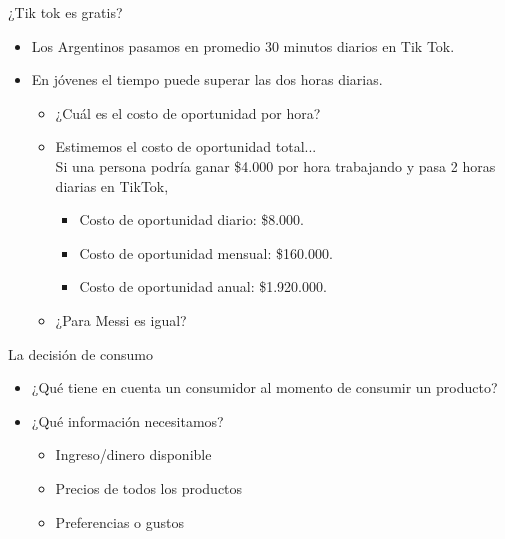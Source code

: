 \documentclass{beamer}
\begin{document}
\begin{frame}{¿Tik tok es gratis?}
    \begin{itemize}
        \item Los Argentinos pasamos en promedio 30 minutos diarios en Tik Tok. \vspace{2mm}
        \item En jóvenes el tiempo puede superar las dos horas diarias. \vspace{2mm}
        \begin{itemize}
        \item ¿Cuál es el costo de oportunidad por hora? \vspace{2mm}
        \item Estimemos el costo de oportunidad total... \\ \pause \vspace{2mm}
        Si una persona podría ganar \$4.000 por hora trabajando y pasa 2 horas diarias en TikTok, \vspace{2mm} \pause 
        \begin{itemize}
         \item Costo de oportunidad diario: \$8.000. 
         \item Costo de oportunidad mensual: \$160.000. 
         \item Costo de oportunidad anual: \$1.920.000. 
        \end{itemize}
        \vspace{2mm} \pause 
        \item ¿Para Messi es igual?
        \end{itemize}
    \end{itemize} 
\end{frame}

\begin{frame}{La decisión de consumo}
    \begin{itemize}
    \item ¿Qué tiene en cuenta un consumidor al momento de consumir un producto? \vspace{2mm}
    \item ¿Qué información necesitamos? \vspace{2mm}
    \begin{itemize}
        \item Ingreso/dinero disponible \vspace{2mm}
        \item Precios de todos los productos \vspace{2mm}
        \item Preferencias o gustos
        \end{itemize}
    \end{itemize}
\end{frame}
\end{document}
